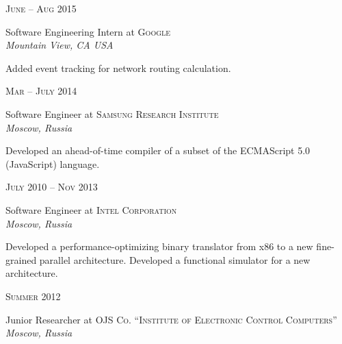 \documentclass[10pt]{article} %
\begin{document}
\begin{minipage}[h]{0.5\textwidth}

{\raggedleft\textsc{June -- Aug 2015}\par}

{\raggedright\large Software Engineering Intern at \textsc{Google}\\
\textit{Mountain View, CA USA}\\[4pt]}

\normalsize{Added event tracking for network routing calculation.}\\


{\raggedleft\textsc{Mar -- July 2014}\par}

{\raggedright\large Software Engineer at \textsc{Samsung Research Institute}\\
\textit{Moscow, Russia}\\[4pt]}

\normalsize{Developed an ahead-of-time compiler of a subset of the ECMAScript 5.0 (JavaScript) language.}\\


{\raggedleft\textsc{July 2010 -- Nov 2013}\par}

{\raggedright\large Software Engineer at \textsc{Intel Corporation}\\
\textit{Moscow, Russia}\\[4pt]}

\normalsize{Developed a performance-optimizing binary translator from x86 to a
  new fine-grained parallel architecture.
  Developed a functional simulator for a new architecture.}\\


{\raggedleft\textsc{Summer 2012}\par}

{\raggedright\large Junior Researcher at \textsc{OJS Co. ``Institute of Electronic Control Computers''}\\
\textit{Moscow, Russia}\\[4pt]}


\end{minipage}
\end{document}
